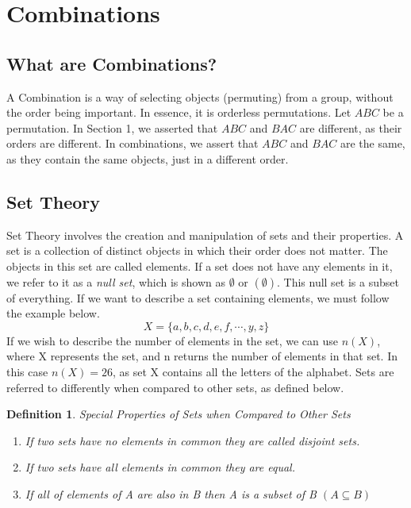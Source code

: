 \documentclass[final,1p,12pt]{elsarticle}
\newtheorem{definition}{Definition}
\begin{document}
\section{Combinations}

    \subsection{What are Combinations?}
     A Combination is a way of selecting objects (permuting) from a group, without the order being important. In essence, it is orderless permutations. Let $ABC$ be a permutation. In Section 1, we asserted that $ABC$ and $BAC$ are different, as their orders are different. In combinations, we assert that $ABC$ and $BAC$ are the same, as they contain the same objects, just in a different order.

    \subsection{Set Theory}
    Set Theory involves the creation and manipulation of sets and their properties. A set is a collection of distinct objects in which their order does not matter. The objects in this set are called elements. If a set does not have any elements in it, we refer to it as a \emph{null set}, which is shown as $\emptyset$ or $(\emptyset)$. This null set is a subset of everything. If we want to describe a set containing elements, we must follow the example below.
    \begin{equation*}
        X = \{a,b,c,d,e,f,\cdots,y,z\}
    \end{equation*}
    If we wish to describe the number of elements in the set, we can use $n(X)$, where X represents the set, and n returns the number of elements in that set. In this case $n(X) = 26$, as set X contains all the letters of the alphabet. Sets are referred to differently when compared to other sets, as defined below.
    \begin{definition}
    Special Properties of Sets when Compared to Other Sets
    \begin{enumerate}
        \item If two sets have no elements in common they are called disjoint sets.
        \item If two sets have all elements in common they are equal.
        \item If all of elements of A are also in B then A is a subset of B $(A\subseteq B)$
    \end{enumerate}
    \end{definition}
    
\end{document}
